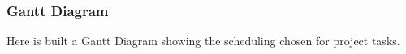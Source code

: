\subsubsection{Gantt Diagram}
Here is built a Gantt Diagram showing the scheduling chosen for \myTaxiService{} project tasks.
\begin{center}
	\begin{ganttchart}[hgrid=true, x unit=2.5mm, link bulge=0.9]{1}{44}
		  \\
			   \\
		 \\
		 \\
		 \\
		 \\
		 \\
		 \\
		 \\
		 \\
		 \\
		 \\
		 \\
		 \\
		 \\
	\end{ganttchart}
\end{center}
%